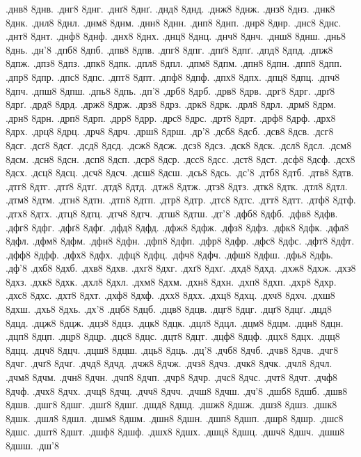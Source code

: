 {.днв8 8днв.
.днг8 8днг.
.днґ8 8днґ.
.днд8 8днд.
.днж8 8днж.
.днз8 8днз.
.днк8 8днк.
.днл8 8днл.
.днм8 8днм.
.днн8 8днн.
.днп8 8днп.
.днр8 8днр.
.днс8 8днс.
.днт8 8днт.
.днф8 8днф.
.днх8 8днх.
.днц8 8днц.
.днч8 8днч.
.днш8 8днш.
.днь8 8днь.
.дн'8
.дпб8 8дпб.
.дпв8 8дпв.
.дпг8 8дпг.
.дпґ8 8дпґ.
.дпд8 8дпд.
.дпж8 8дпж.
.дпз8 8дпз.
.дпк8 8дпк.
.дпл8 8дпл.
.дпм8 8дпм.
.дпн8 8дпн.
.дпп8 8дпп.
.дпр8 8дпр.
.дпс8 8дпс.
.дпт8 8дпт.
.дпф8 8дпф.
.дпх8 8дпх.
.дпц8 8дпц.
.дпч8 8дпч.
.дпш8 8дпш.
.дпь8 8дпь.
.дп'8
.дрб8 8дрб.
.дрв8 8дрв.
.дрг8 8дрг.
.дрґ8 8дрґ.
.дрд8 8дрд.
.држ8 8држ.
.дрз8 8дрз.
.дрк8 8дрк.
.дрл8 8дрл.
.дрм8 8дрм.
.дрн8 8дрн.
.дрп8 8дрп.
.дрр8 8дрр.
.дрс8 8дрс.
.дрт8 8дрт.
.дрф8 8дрф.
.дрх8 8дрх.
.дрц8 8дрц.
.дрч8 8дрч.
.дрш8 8дрш.
.др'8
.дсб8 8дсб.
.дсв8 8дсв.
.дсг8 8дсг.
.дсґ8 8дсґ.
.дсд8 8дсд.
.дсж8 8дсж.
.дсз8 8дсз.
.дск8 8дск.
.дсл8 8дсл.
.дсм8 8дсм.
.дсн8 8дсн.
.дсп8 8дсп.
.дср8 8дср.
.дсс8 8дсс.
.дст8 8дст.
.дсф8 8дсф.
.дсх8 8дсх.
.дсц8 8дсц.
.дсч8 8дсч.
.дсш8 8дсш.
.дсь8 8дсь.
.дс'8
.дтб8 8дтб.
.дтв8 8дтв.
.дтг8 8дтг.
.дтґ8 8дтґ.
.дтд8 8дтд.
.дтж8 8дтж.
.дтз8 8дтз.
.дтк8 8дтк.
.дтл8 8дтл.
.дтм8 8дтм.
.дтн8 8дтн.
.дтп8 8дтп.
.дтр8 8дтр.
.дтс8 8дтс.
.дтт8 8дтт.
.дтф8 8дтф.
.дтх8 8дтх.
.дтц8 8дтц.
.дтч8 8дтч.
.дтш8 8дтш.
.дт'8
.дфб8 8дфб.
.дфв8 8дфв.
.дфг8 8дфг.
.дфґ8 8дфґ.
.дфд8 8дфд.
.дфж8 8дфж.
.дфз8 8дфз.
.дфк8 8дфк.
.дфл8 8дфл.
.дфм8 8дфм.
.дфн8 8дфн.
.дфп8 8дфп.
.дфр8 8дфр.
.дфс8 8дфс.
.дфт8 8дфт.
.дфф8 8дфф.
.дфх8 8дфх.
.дфц8 8дфц.
.дфч8 8дфч.
.дфш8 8дфш.
.дфь8 8дфь.
.дф'8
.дхб8 8дхб.
.дхв8 8дхв.
.дхг8 8дхг.
.дхґ8 8дхґ.
.дхд8 8дхд.
.дхж8 8дхж.
.дхз8 8дхз.
.дхк8 8дхк.
.дхл8 8дхл.
.дхм8 8дхм.
.дхн8 8дхн.
.дхп8 8дхп.
.дхр8 8дхр.
.дхс8 8дхс.
.дхт8 8дхт.
.дхф8 8дхф.
.дхх8 8дхх.
.дхц8 8дхц.
.дхч8 8дхч.
.дхш8 8дхш.
.дхь8 8дхь.
.дх'8
.дцб8 8дцб.
.дцв8 8дцв.
.дцг8 8дцг.
.дцґ8 8дцґ.
.дцд8 8дцд.
.дцж8 8дцж.
.дцз8 8дцз.
.дцк8 8дцк.
.дцл8 8дцл.
.дцм8 8дцм.
.дцн8 8дцн.
.дцп8 8дцп.
.дцр8 8дцр.
.дцс8 8дцс.
.дцт8 8дцт.
.дцф8 8дцф.
.дцх8 8дцх.
.дцц8 8дцц.
.дцч8 8дцч.
.дцш8 8дцш.
.дць8 8дць.
.дц'8
.дчб8 8дчб.
.дчв8 8дчв.
.дчг8 8дчг.
.дчґ8 8дчґ.
.дчд8 8дчд.
.дчж8 8дчж.
.дчз8 8дчз.
.дчк8 8дчк.
.дчл8 8дчл.
.дчм8 8дчм.
.дчн8 8дчн.
.дчп8 8дчп.
.дчр8 8дчр.
.дчс8 8дчс.
.дчт8 8дчт.
.дчф8 8дчф.
.дчх8 8дчх.
.дчц8 8дчц.
.дчч8 8дчч.
.дчш8 8дчш.
.дч'8
.дшб8 8дшб.
.дшв8 8дшв.
.дшг8 8дшг.
.дшґ8 8дшґ.
.дшд8 8дшд.
.дшж8 8дшж.
.дшз8 8дшз.
.дшк8 8дшк.
.дшл8 8дшл.
.дшм8 8дшм.
.дшн8 8дшн.
.дшп8 8дшп.
.дшр8 8дшр.
.дшс8 8дшс.
.дшт8 8дшт.
.дшф8 8дшф.
.дшх8 8дшх.
.дшц8 8дшц.
.дшч8 8дшч.
.дшш8 8дшш.
.дш'8
}
